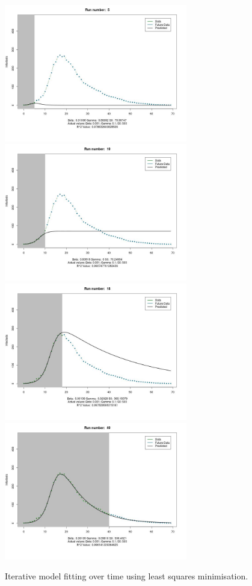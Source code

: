 \begin{centering}
\begin{figure}[h!]
  \includegraphics[width=8cm]{images/sirs0_5.jpeg}
  \includegraphics[width=8cm]{images/sirs0_10.jpeg}
  \includegraphics[width=8cm]{images/sirs0_18.jpeg}
  \includegraphics[width=8cm]{images/sirs0_40.jpeg}
\caption{Iterative model fitting over time using least squares minimisation.}
  \end{figure}
\end{centering}

